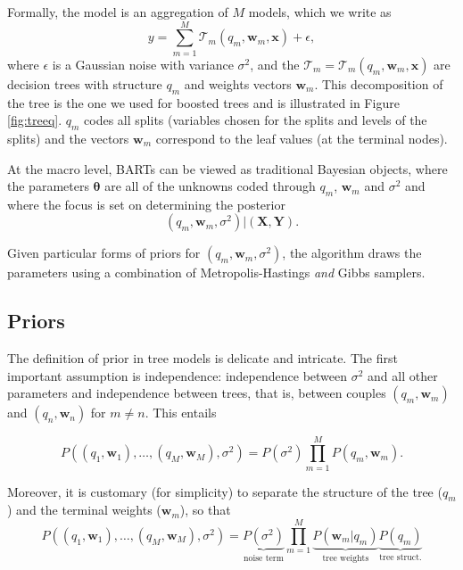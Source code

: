 \documentclass[]{krantz}
\theoremstyle{definition}
\theoremstyle{definition}
\theoremstyle{definition}
\theoremstyle{remark}
\begin{document}
Formally, the model is an aggregation of \(M\) models, which we write as
\begin{equation}
\label{eq:BART}
y = \sum_{m=1}^M\mathcal{T}_m(q_m,\textbf{w}_m, \textbf{x}) + \epsilon,
\end{equation} where \(\epsilon\) is a Gaussian noise with variance
\(\sigma^2\), and the
\(\mathcal{T}_m=\mathcal{T}_m(q_m,\textbf{w}_m, \textbf{x})\) are
decision trees with structure \(q_m\) and weights vectors
\(\textbf{w}_m\). This decomposition of the tree is the one we used for
boosted trees and is illustrated in Figure \ref{fig:treeq}. \(q_m\)
codes all splits (variables chosen for the splits and levels of the
splits) and the vectors \(\textbf{w}_m\) correspond to the leaf values
(at the terminal nodes).

At the macro level, BARTs can be viewed as traditional Bayesian objects,
where the parameters \(\boldsymbol{\theta}\) are all of the unknowns
coded through \(q_m\), \(\textbf{w}_m\) and \(\sigma^2\) and where the
focus is set on determining the posterior \begin{equation}
\label{eq:bartpost}
\left(q_m,\textbf{w}_m,\sigma^2\right) | (\textbf{X}, \textbf{Y}).
\end{equation}

Given particular forms of priors for
\(\left(q_m,\textbf{w}_m,\sigma^2\right)\), the algorithm draws the
parameters using a combination of Metropolis-Hastings \emph{and} Gibbs
samplers.

\hypertarget{priors}{%
\subsection{Priors}\label{priors}}

The definition of prior in tree models is delicate and intricate. The
first important assumption is independence: independence between
\(\sigma^2\) and all other parameters and independence between trees,
that is, between couples \((q_m,\textbf{w}_m)\) and
\((q_n,\textbf{w}_n)\) for \(m\neq n\). This entails

\[P(\left(q_1,\textbf{w}_1\right),\dots,\left(q_M,\textbf{w}_M\right),\sigma^2)=P(\sigma^2)\prod_{m=1}^MP\left(q_m,\textbf{w}_m\right).\]

Moreover, it is customary (for simplicity) to separate the structure of
the tree (\(q_m\)) and the terminal weights (\(\textbf{w}_m\)), so that
\begin{equation}
\label{eq:bart1}
P(\left(q_1,\textbf{w}_1\right),\dots,\left(q_M,\textbf{w}_M\right),\sigma^2)=\underbrace{P(\sigma^2)}_{\text{noise term}}\prod_{m=1}^M\underbrace{P\left(\textbf{w}_m|q_m\right)}_{\text{tree weights}}\underbrace{P(q_m)}_{\text{tree struct.}}
\end{equation}
\end{document}
